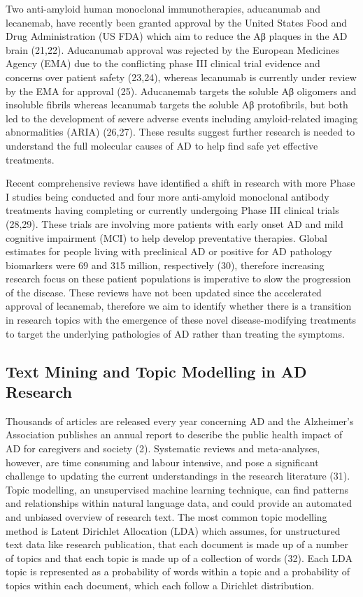 \documentclass[
  a4paper,
]{article}
\begin{document}
Two anti-amyloid human monoclonal immunotherapies, aducanumab and
lecanemab, have recently been granted approval by the United States Food
and Drug Administration (US FDA) which aim to reduce the Aβ plaques in
the AD brain (21,22). Aducanumab approval was rejected by the European
Medicines Agency (EMA) due to the conflicting phase III clinical trial
evidence and concerns over patient safety (23,24), whereas lecanumab is
currently under review by the EMA for approval (25). Aducanemab targets
the soluble Aβ oligomers and insoluble fibrils whereas lecanumab targets
the soluble Aβ protofibrils, but both led to the development of severe
adverse events including amyloid-related imaging abnormalities (ARIA)
(26,27). These results suggest further research is needed to understand
the full molecular causes of AD to help find safe yet effective
treatments.

Recent comprehensive reviews have identified a shift in research with
more Phase I studies being conducted and four more anti-amyloid
monoclonal antibody treatments having completing or currently undergoing
Phase III clinical trials (28,29). These trials are involving more
patients with early onset AD and mild cognitive impairment (MCI) to help
develop preventative therapies. Global estimates for people living with
preclinical AD or positive for AD pathology biomarkers were 69 and 315
million, respectively (30), therefore increasing research focus on these
patient populations is imperative to slow the progression of the
disease. These reviews have not been updated since the accelerated
approval of lecanemab, therefore we aim to identify whether there is a
transition in research topics with the emergence of these novel
disease-modifying treatments to target the underlying pathologies of AD
rather than treating the symptoms.

\hypertarget{text-mining-and-topic-modelling-in-ad-research}{%
\subsection{Text Mining and Topic Modelling in AD
Research}\label{text-mining-and-topic-modelling-in-ad-research}}

Thousands of articles are released every year concerning AD and the
Alzheimer's Association publishes an annual report to describe the
public health impact of AD for caregivers and society (2). Systematic
reviews and meta-analyses, however, are time consuming and labour
intensive, and pose a significant challenge to updating the current
understandings in the research literature (31). Topic modelling, an
unsupervised machine learning technique, can find patterns and
relationships within natural language data, and could provide an
automated and unbiased overview of research text. The most common topic
modelling method is Latent Dirichlet Allocation (LDA) which assumes, for
unstructured text data like research publication, that each document is
made up of a number of topics and that each topic is made up of a
collection of words (32). Each LDA topic is represented as a probability
of words within a topic and a probability of topics within each
document, which each follow a Dirichlet distribution.
\end{document}
